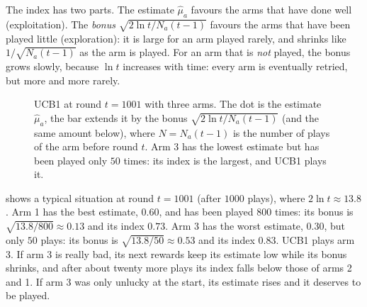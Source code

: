 The index has two parts. The estimate $\hat\mu_a$ favours the arms that
have done well (exploitation). The \emph{bonus} $\sqrt{2 \ln t / N_a(t-1)}$
favours the arms that have been played little (exploration): it is large
for an arm played rarely, and shrinks like $1/\sqrt{N_a(t-1)}$ as the arm
is played. For an arm that is \emph{not} played, the bonus grows slowly,
because $\ln t$ increases with time: every arm is eventually retried, but
more and more rarely.

\begin{figure}[ht]
  \centering
  \caption{UCB1 at round $t = 1001$ with three arms. The dot is the
    estimate $\hat\mu_a$, the bar extends it by the bonus $\sqrt{2 \ln t /
    N_a(t-1)}$ (and the same amount below), where $N = N_a(t-1)$ is the
    number of plays of the arm before round $t$. Arm 3 has the lowest
    estimate but has
    been played only $50$ times: its index is the largest, and UCB1 plays
    it.}
  \label{fig:ucb1}
\end{figure}

 shows a typical situation at round $t = 1001$ (after
$1000$ plays), where $2
\ln t \approx 13.8$. Arm 1 has the best estimate, $0.60$, and has been
played $800$ times: its bonus is $\sqrt{13.8/800} \approx 0.13$ and its
index $0.73$. Arm 3 has the worst estimate, $0.30$, but only $50$ plays: its
bonus is $\sqrt{13.8/50} \approx 0.53$ and its index $0.83$. UCB1 plays arm
3. If arm 3 is really bad, its next rewards keep its estimate low while its
bonus shrinks, and after about twenty more plays its index falls below
those of arms 2 and 1. If arm 3 was only unlucky at the start, its estimate
rises and it deserves to be played.

